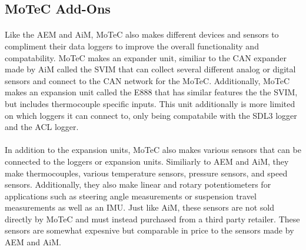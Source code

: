 \subsection{MoTeC Add-Ons}

\paragraph{}
Like the AEM and AiM, MoTeC also makes different devices and sensors to compliment their data loggers to improve the overall functionality and compatability.
MoTeC makes an expander unit, similiar to the CAN expander made by AiM called the SVIM that can collect several different analog or digital sensors and connect to the CAN network for the MoTeC.
Additionally, MoTeC makes an expansion unit called the E888 that has similar features the the SVIM, but includes thermocouple specific inputs.
This unit additionally is more limited on which loggers it can connect to, only being compatabile with the SDL3 logger and the ACL logger.

\paragraph{}
In addition to the expansion units, MoTeC also makes various sensors that can be connected to the loggers or expansion units.
Similiarly to AEM and AiM, they make thermocouples, various temperature sensors, pressure sensors, and speed sensors.
Additionally, they also make linear and rotary potentiometers for applications such as steering angle measurements or suspension travel measurements as well as an IMU.
Just like AiM, these sensors are not sold directly by MoTeC and must instead purchased from a third party retailer.
These sensors are somewhat expesnive but comparable in price to the sensors made by AEM and AiM.